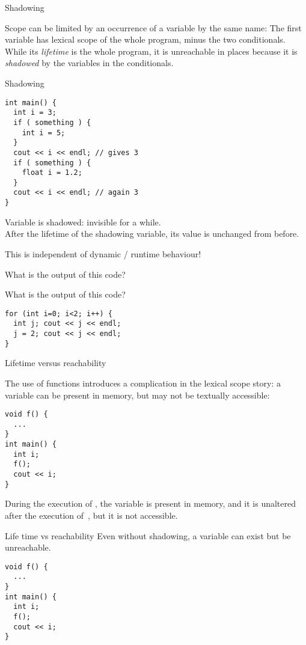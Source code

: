  {Shadowing}

Scope can be limited by an occurrence of a variable by the same name:
%
%
The first variable  has lexical scope of the whole program, minus
the two conditionals. While its
\emph{lifetime} is the whole program, it is
unreachable in places because it is
\emph{shadowed} by the variables  in the conditionals.

\begin{slide}{Shadowing}
  \label{sl:scope-shadow}
\begin{verbatim}
int main() {
  int i = 3;
  if ( something ) {
    int i = 5;
  }
  cout << i << endl; // gives 3
  if ( something ) {
    float i = 1.2;
  }
  cout << i << endl; // again 3
}
\end{verbatim}
Variable  is shadowed: invisible for a while.\\
After the lifetime of the shadowing variable, its value is unchanged
from before.
\end{slide}

This is independent of dynamic / runtime behaviour!

\begin{exercise}
  \label{ex:shadowfalse}
  What is the output of this code?
\end{exercise}

\begin{exercise}
  \label{ex:loopinitvar}
  What is the output of this code?
\begin{verbatim}
for (int i=0; i<2; i++) {
  int j; cout << j << endl;
  j = 2; cout << j << endl;
}
\end{verbatim}
\end{exercise}

 {Lifetime versus reachability}

The use of functions introduces a complication in the lexical scope story:
a variable can be present in memory, but may not be textually accessible:
\begin{verbatim}
void f() {
  ...
}
int main() {
  int i;
  f();
  cout << i;
}
\end{verbatim}
During the execution of , the variable  is present in
memory, and it is unaltered after the execution of~,
but it is not accessible.

\begin{slide}{Life time vs reachability}
  \label{sl:scope-lifetime}
  Even without shadowing, a variable can exist but be unreachable.
\begin{verbatim}
void f() {
  ...
}
int main() {
  int i;
  f();
  cout << i;
}
\end{verbatim}
\end{slide}

